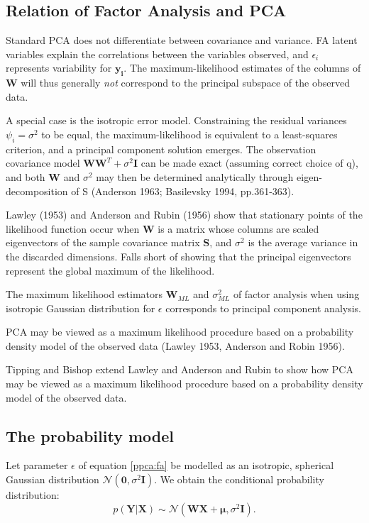 \documentclass[ %
                    author={Dillon Keith Diep},
                supervisor={Dr. Carl Henrik Ek},
                    degree={MEng},
                     title={Assisted Content Generation for 3D Hair Geometry},
                  subtitle={[INCOMPLETE DRAFT, CONTAINS NOTES FROM RESEARCH]},
                      type={Research},
                      year={2014} ]{dissertation}
\begin{document}
\subsection{Relation of Factor Analysis and PCA}

Standard PCA does not differentiate between covariance and variance. FA latent variables explain the correlations between the variables observed, and $\epsilon_i$ represents variability for $\mathbf{y_i}$. The maximum-likelihood estimates of the columns of $\mathbf{W}$ will thus generally \textit{not} correspond to the principal subspace of the observed data.

A special case is the isotropic error model. Constraining the residual variances $\psi_i=\sigma^2$ to be equal, the maximum-likelihood is equivalent to a least-squares criterion, and a principal component solution emerges.
The observation covariance model $\mathbf{WW}^T+\sigma^2\mathbf{I}$ can be made exact (assuming correct choice of q), and both $\mathbf{W}$ and $\sigma^2$ may then be determined analytically through eigen-decomposition of S (Anderson 1963; Basilevsky 1994, pp.361-363).

Lawley (1953) and Anderson and Rubin (1956) show that stationary points of the likelihood function occur when $\mathbf{W}$ is a matrix whose columns are scaled eigenvectors of the sample covariance matrix $\mathbf{S}$, and $\sigma^2$ is the average variance in the discarded dimensions. Falls short of showing that the principal eigenvectors represent the global maximum of the likelihood.

The maximum likelihood estimators $\mathbf{W}_{ML}$ and $\sigma^2_{ML}$ of factor analysis when using isotropic Gaussian distribution for $\epsilon$ corresponds to principal component analysis.

PCA may be viewed as a maximum likelihood procedure based on a probability density model of the observed data (Lawley 1953, Anderson and Robin 1956).

Tipping and Bishop extend Lawley and Anderson and Rubin to show how PCA may be viewed as a maximum likelihood procedure based on a probability density model of the observed data.

\subsection{The probability model}
Let parameter $\epsilon$ of equation \ref{ppca:fa} be modelled as an isotropic, spherical Gaussian distribution $\mathcal{N}(\mathbf{0},\sigma^2\mathbf{I})$. We obtain the conditional probability distribution:
\begin{equation} \label{ppca:conditional}
	p(\mathbf{Y|X})\sim\mathcal{N}(\mathbf{WX+\mu},\sigma^2\mathbf{I}). 
\end{equation}
\end{document}
